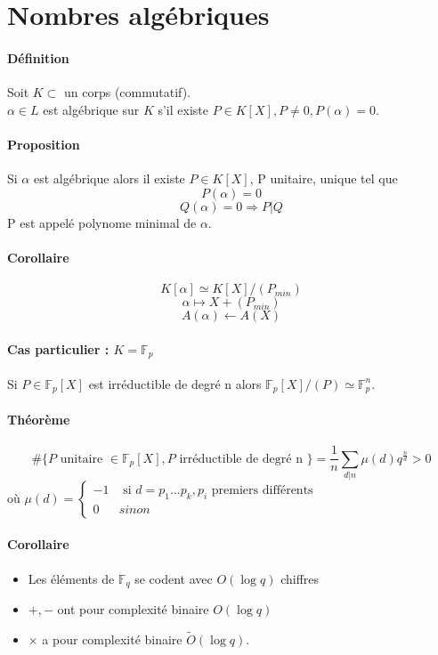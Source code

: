 \documentclass[12pt,a4paper]{report}
\begin{document}
\section{Nombres algébriques}
\paragraph{Définition\\}
Soit $ K\subset $ un corps (commutatif).\\
$\alpha \in L$ est algébrique sur $K$ s'il existe $ P \in K[X], P\neq 0, P(\alpha)=0$.
\paragraph{Proposition\\}
Si $\alpha$ est algébrique alors il existe $P \in K[X]$, P unitaire, unique tel que 
$$ P(\alpha) = 0$$
$$ Q(\alpha)=0 \Rightarrow P | Q$$
P est appelé polynome minimal de $\alpha$.
\paragraph{Corollaire\\}
$$K[\alpha] \simeq K[X] / (P_{min})$$
$$ \alpha \mapsto X + (P_{min})$$
$$A(\alpha) \leftarrow A(X)$$
\paragraph{Cas particulier : $K=\mathbb{F}_p$\\}
Si $P \in \mathbb{F}_p[X]$ est irréductible de degré n alors $\mathbb{F}_p[X]/(P) \simeq \mathbb{F}_p^n$.
\paragraph{Théorème\\}
$$\#\{P \mbox{ unitaire } \in \mathbb{F}_p[X], P \mbox{ irréductible de degré n }\} = \frac{1}{n} \sum_{d|n} \mu (d) q^{\frac{n}{d}}>0$$
où $\mu (d) = \left\{ \begin{array}{ll}
-1 & \mbox{ si } d=p_1\ldots p_k, p_i \mbox{ premiers différents}\\
0 & sinon \end{array}\right.$
\paragraph{Corollaire\\}
\begin{itemize}
\item Les éléments de $\mathbb{F}_q$ se codent avec $O(\log q)$ chiffres 
\item $+,-$ ont pour complexité binaire $O(\log q)$
\item $\times$ a pour complexité binaire $\tilde{O}(\log q)$.
\end{itemize}
\end{document}
